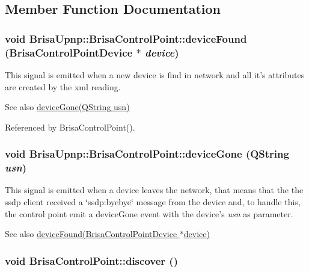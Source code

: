 \subsection{Member Function Documentation}
\hypertarget{classBrisaUpnp_1_1BrisaControlPoint_aaef59f4a10f5e9d61eed30baba7903e3}{
\subsubsection[{deviceFound}]{\setlength{\rightskip}{0pt plus 5cm}void BrisaUpnp::BrisaControlPoint::deviceFound ({\bf BrisaControlPointDevice} $\ast$ {\em device})}}
\label{classBrisaUpnp_1_1BrisaControlPoint_aaef59f4a10f5e9d61eed30baba7903e3}


This signal is emitted when a new device is find in network and all it's attributes are created by the xml reading. \begin{DoxySeeAlso}{See also}
\hyperlink{classBrisaUpnp_1_1BrisaControlPoint_ae60f102af98193f08977fdcf9f051ab1}{deviceGone(QString usn)} 
\end{DoxySeeAlso}


Referenced by BrisaControlPoint().\hypertarget{classBrisaUpnp_1_1BrisaControlPoint_ae60f102af98193f08977fdcf9f051ab1}{
\subsubsection[{deviceGone}]{\setlength{\rightskip}{0pt plus 5cm}void BrisaUpnp::BrisaControlPoint::deviceGone (QString {\em usn})}}
\label{classBrisaUpnp_1_1BrisaControlPoint_ae60f102af98193f08977fdcf9f051ab1}


This signal is emitted when a device leaves the network, that means that the the ssdp client received a \char`\"{}ssdp:byebye\char`\"{} message from the device and, to handle this, the control point emit a deviceGone event with the device's {\itshape usn\/} as parameter. \begin{DoxySeeAlso}{See also}
\hyperlink{classBrisaUpnp_1_1BrisaControlPoint_aaef59f4a10f5e9d61eed30baba7903e3}{deviceFound(BrisaControlPointDevice $\ast$device)} 
\end{DoxySeeAlso}
\hypertarget{classBrisaUpnp_1_1BrisaControlPoint_a369ace207c8aeb4256e10248c0c31c35}{
\subsubsection[{discover}]{\setlength{\rightskip}{0pt plus 5cm}void BrisaControlPoint::discover ()}}
\label{classBrisaUpnp_1_1BrisaControlPoint_a369ace207c8aeb4256e10248c0c31c35}


